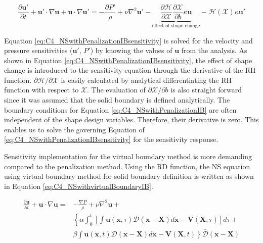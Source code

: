 \begin{equation}\label{eq:C4_NSwithPenalizationIBsensitivity}
    \frac{\partial \mathbf{u}'}{\partial t} +
    \mathbf{u}' \cdot \nabla \mathbf{u} + \mathbf{u} \cdot \nabla \mathbf{u}' = 
    -\frac{\partial P'}{\rho} + 
    \nu \nabla^2 \mathbf{u}' - 
    \underbrace{\frac{\partial \mathcal{H}}{\partial \mathcal{X}} \frac{\partial \mathcal{X}}{\partial b} \kappa \mathbf{u}}_\text{effect of shape change} - 
    \mathcal{H}(\mathcal{X}) \kappa \mathbf{u}'
\end{equation}

Equation \eqref{eq:C4_NSwithPenalizationIBsensitivity} is solved for the velocity and pressure sensitivities ($\mathbf{u}'$, $P'$) by knowing the values of $\mathbf{u}$ from the analysis. As shown in Equation \eqref{eq:C4_NSwithPenalizationIBsensitivity}, the effect of shape change is introduced to the sensitivity equation through the derivative of the RH function. $\partial \mathcal{H}/\partial \mathcal{X}$ is easily calculated by analytical differentiating the RH function with respect to $\mathcal{X}$. The evaluation of $\partial \mathcal{X}/\partial b$ is also straight forward since it was assumed that the solid boundary is defined analytically. The boundary conditions for Equation \eqref{eq:C4_NSwithPenalizationIB} are often independent of the shape design variables. Therefore, their derivative is zero. This enables us to solve the governing Equation of \eqref{eq:C4_NSwithPenalizationIBsensitivity} for the sensitivity response.

Sensitivity implementation for the virtual boundary method is more demanding compared to the penalization method. Using the RD function, the NS equation using virtual boundary method for solid boundary definition is written as shown in Equation \eqref{eq:C4_NSwithvirtualBoundaryIB}.

\begin{align}\label{eq:C4_NSwithvirtualBoundaryIB}
    \frac{\partial \mathbf{u}}{\partial t} + 
    \mathbf{u} \cdot \nabla \mathbf{u} = 
    &-\frac{\nabla P}{\rho} + 
    \nu \nabla^2 \mathbf{u} + \nonumber \\
    &\left\{
    \alpha
    \int_0^t
    \left[
        \int \mathbf{u}(\mathbf{x}, \tau) \mathcal{D}(\mathbf{x} - \mathbf{X}) d\mathbf{x} - \mathbf{V}(\mathbf{X}, \tau)
    \right] d\tau \right.
    + \nonumber \\
    &
    \left.
    \beta
    \int \mathbf{u}(\mathbf{x}, t) \mathcal{D}(\mathbf{x} - \mathbf{X}) d\mathbf{x} - \mathbf{V}(\mathbf{X}, t)
    \right\} \bar{\mathcal{D}}(\mathbf{x} - \mathbf{X})
\end{align}

